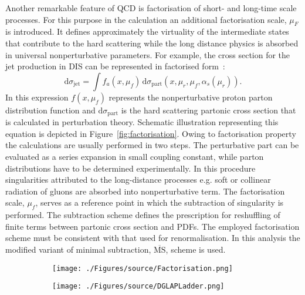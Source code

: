Another remarkable feature of QCD is factorisation of short- and long-time scale processes. For this purpose in the calculation an additional factorisation scale, $\mu_F$ is introduced. It defines approximately the virtuality of the intermediate states that contribute to the hard scattering while the long distance physics is absorbed in universal nonperturbative parameters. For example, the cross section for the jet production in DIS can be represented in factorised form~\cite{Collins Factorization of Hard Processes in}:
\begin{equation}
 \mathrm{d}\sigma_{\mathrm{jet}} = \int{f_a\left(x,\mu_f\right)}\, \mathrm{d}\sigma_{\mathrm{part}}\left(x,\mu_r, \mu_f, \alpha_s\left(\mu_r\right) \right).
\label{eq:disfactorisation}
\end{equation} 
In this expression $f\left(x,\mu_f\right)$ represents the nonperturbative proton parton distribution function and $\mathrm{d}\sigma_{\mathrm{part}}$ is the hard scattering partonic cross section that is calculated in perturbation theory. Schematic illustration representing this equation is depicted in Figure~\ref{fig:factorisation}. Owing to factorisation property the calculations are usually performed in two steps. The perturbative part can be evaluated as a series expansion in small coupling constant, while parton distributions have to be determined experimentally. In this procedure singularities attributed to the long-distance processes e.g. soft or collinear radiation of gluons are absorbed into nonperturbative term. The factorisation scale, $\mu_f$, serves as a reference point in which the subtraction of singularity is performed. The subtraction scheme defines the prescription for reshuffling of finite terms between partonic cross section and PDFs. The employed factorisation scheme must be consistent with that used for renormalisation. In this analysis the modified variant of minimal subtraction, $\overline{\mathrm{MS}}$, scheme is used.
\begin{figure}[t]
	\centering
	\begin{subfigure}{.49\textwidth}
		\centering
		\texttt{[image: ./Figures/source/Factorisation.png]}
		\caption{ }
		\label{fig:Factorisation}
	\end{subfigure}
	\begin{subfigure}{.49\textwidth}
		\texttt{[image: ./Figures/source/DGLAPLadder.png]}
		\caption{ }
		\label{fig:DGLAPLadder}
	\end{subfigure}
	\caption{}
\label{fig:factorisationdglapladder}
\end{figure}
